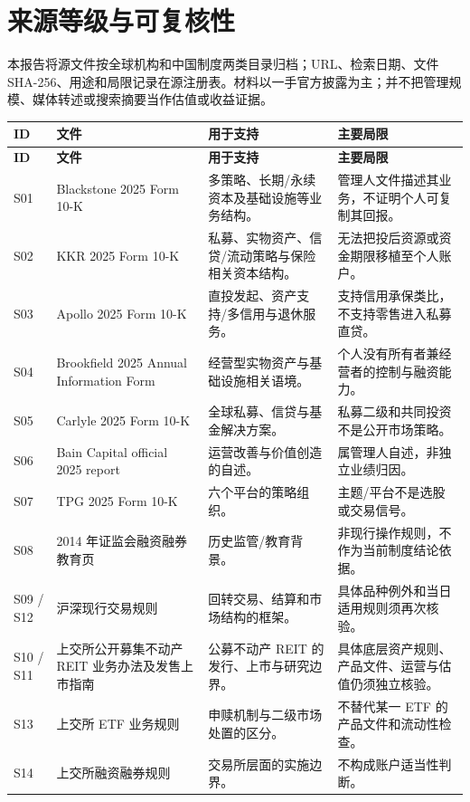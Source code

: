 \section{来源等级与可复核性}

本报告将源文件按全球机构和中国制度两类目录归档；URL、检索日期、文件 SHA-256、用途和局限记录在源注册表。材料以一手官方披露为主；并不把管理规模、媒体转述或搜索摘要当作估值或收益证据。

\begin{longtable}{L{1.05cm} L{3.6cm} L{3.0cm} L{5.15cm}}
\toprule
\textbf{ID} & \textbf{文件} & \textbf{用于支持} & \textbf{主要局限} \\
\midrule
\endfirsthead
\toprule
\textbf{ID} & \textbf{文件} & \textbf{用于支持} & \textbf{主要局限} \\
\midrule
\endhead
S01 & Blackstone 2025 Form 10-K & 多策略、长期/永续资本及基础设施等业务结构。 & 管理人文件描述其业务，不证明个人可复制其回报。 \\
S02 & KKR 2025 Form 10-K & 私募、实物资产、信贷/流动策略与保险相关资本结构。 & 无法把投后资源或资金期限移植至个人账户。 \\
S03 & Apollo 2025 Form 10-K & 直投发起、资产支持/多信用与退休服务。 & 支持信用承保类比，不支持零售进入私募直贷。 \\
S04 & Brookfield 2025 Annual Information Form & 经营型实物资产与基础设施相关语境。 & 个人没有所有者兼经营者的控制与融资能力。 \\
S05 & Carlyle 2025 Form 10-K & 全球私募、信贷与基金解决方案。 & 私募二级和共同投资不是公开市场策略。 \\
S06 & Bain Capital official 2025 report & 运营改善与价值创造的自述。 & 属管理人自述，非独立业绩归因。 \\
S07 & TPG 2025 Form 10-K & 六个平台的策略组织。 & 主题/平台不是选股或交易信号。 \\
S08 & 2014 年证监会融资融券教育页 & 历史监管/教育背景。 & 非现行操作规则，不作为当前制度结论依据。 \\
S09 / S12 & 沪深现行交易规则 & 回转交易、结算和市场结构的框架。 & 具体品种例外和当日适用规则须再次核验。 \\
S10 / S11 & 上交所公开募集不动产 REIT 业务办法及发售上市指南 & 公募不动产 REIT 的发行、上市与研究边界。 & 具体底层资产规则、产品文件、运营与估值仍须独立核验。 \\
S13 & 上交所 ETF 业务规则 & 申赎机制与二级市场处置的区分。 & 不替代某一 ETF 的产品文件和流动性检查。 \\
S14 & 上交所融资融券规则 & 交易所层面的实施边界。 & 不构成账户适当性判断。 \\
\bottomrule
\end{longtable}

